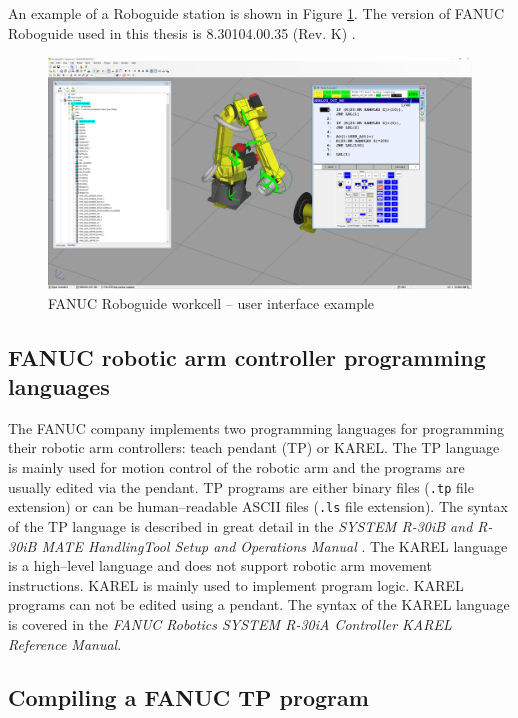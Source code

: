 An example of a Roboguide station is shown in Figure \ref{fig:roboguide}. The version of FANUC Roboguide used in this thesis is 8.30104.00.35 (Rev. K) \cite{roboguide}. 

\begin{figure}[h]
    \centering
    \includegraphics[width=0.9\linewidth]{img/roboguide.PNG}
    \caption{FANUC Roboguide workcell -- user interface example}
    \label{fig:roboguide}
\end{figure}

\subsection{FANUC robotic arm controller programming languages}

The FANUC company implements two programming languages for programming their robotic arm controllers: teach pendant (TP) or KAREL. The TP language is mainly used for motion control of the robotic arm and the programs are usually edited via the pendant. TP programs are either binary files (\texttt{.tp} file extension) or can be human--readable ASCII files (\texttt{.ls} file extension). The syntax of the TP language is described in great detail in the \emph{SYSTEM R-30iB and R-30iB MATE HandlingTool Setup and Operations Manual} \cite{fanuchandling}. The KAREL language is a high--level language and does not support robotic arm movement instructions. KAREL is mainly used to implement program logic. KAREL programs can not be edited using a pendant. The syntax of the KAREL language is covered in the \emph{FANUC Robotics SYSTEM R-30iA Controller KAREL Reference Manual}.

\subsection{Compiling a FANUC TP program}

